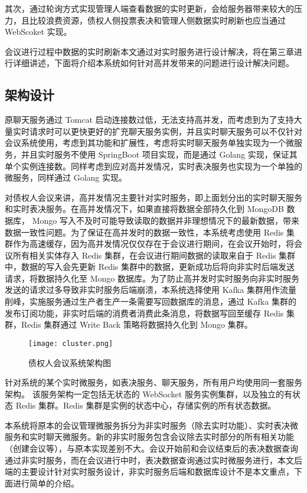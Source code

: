 其次，通过轮询方式实现管理人端查看数据的实时更新，会给服务器带来较大的压力，且比较浪费资源，债权人侧投票表决和管理人侧数据实时刷新也应当通过 WebScoket 实现。

会议进行过程中数据的实时刷新本文通过对实时服务进行设计解决，将在第三章进行详细讲述，下面将介绍本系统如何针对高并发带来的问题进行设计解决问题。

\subsection{架构设计}
原聊天服务通过 Tomcat 启动连接数过低，无法支持高并发，而考虑到为了支持大量实时请求时可以更快更好的扩充聊天服务实例，并且实时聊天服务可以不仅针对会议系统使用，考虑到其功能和扩展性，考虑将实时聊天服务单独实现为一个微服务，并且实时服务不使用 SpringBoot 项目实现，而是通过 Golang 实现，保证其单个实例连接数。同样考虑到应对高并发情况，实时表决服务也实现为一个单独的微服务，同样通过 Golang 实现。

对债权人会议来讲，高并发情况主要针对实时服务，即上面划分出的实时聊天服务和实时表决服务。在高并发情况下，如果直接将数据全部持久化到 MongoDB 数据库， Mongo 写入不及时可能导致读取的数据并非理想情况下的最新数据，带来数据一致性问题。为了保证在高并发时的数据一致性，本系统考虑使用 Redis 集群作为高速缓存，因为高并发情况仅仅存在于会议进行期间，在会议开始时，将会议所有相关实体存入 Redis 集群，在会议进行期间数据的读取来自于 Redis 集群中，数据的写入会先更新 Redis 集群中的数据，更新成功后将向非实时后端发送请求，将数据持久化至 Mongo 数据库。为了防止高并发时实时服务向非实时服务发送的请求过多导致非实时服务后端崩溃，本系统选择使用 Kafka 集群用作流量削峰，实施服务通过生产者生产一条需要写回数据库的消息，通过 Kafka 集群的发布订阅功能，非实时后端的消费者消费此条消息，将数据写回至缓存 Redis 集群，Redis 集群通过 Write Back 策略将数据持久化到 Mongo 集群。

\begin{figure}[!htp]
  \centering
  \texttt{[image: cluster.png]}
  \caption[实时微服务架构]
    {债权人会议系统架构图}
 \label{fig:cluster}
\end{figure}

针对系统的某个实时微服务，如表决服务、聊天服务，所有用户均使用同一套服务架构。
该服务架构一定包括无状态的 WebSocket 服务实例集群，以及独立的有状态 Redis 集群。Redis 集群是实例的状态中心，存储实例的所有状态数据。

本系统将原本的会议管理微服务拆分为非实时服务（除去实时功能）、实时表决微服务和实时聊天微服务。新的非实时服务包含会议除去实时部分的所有相关功能（创建会议等），与原本实现差别不大。会议开始前和会议结束后的表决数据查询通过非实时服务，而在会议进行中时，表决数据查询通过实时微服务进行，本文后端的主要设计针对实时服务设计，非实时服务后端和数据库设计不是本文重点，下面进行简单的介绍。

